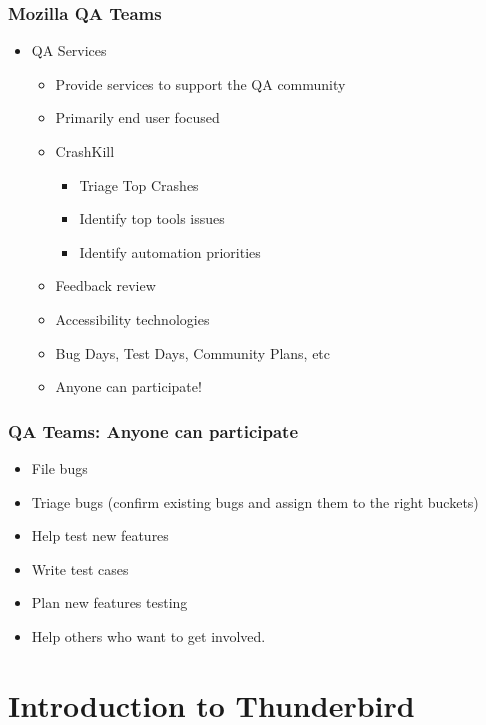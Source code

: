 \documentclass{beamer}
\begin{document}

\begin{frame}
\frametitle{Mozilla QA Teams}
 \begin{itemize}
 \item QA Services
      \begin{itemize}
      \item Provide services to support the QA community
      \item Primarily end user focused
      \item CrashKill
         \begin{itemize}
         \item Triage Top Crashes
         \item Identify top tools issues
         \item Identify automation priorities
         \end{itemize}
      \item Feedback review
      \item Accessibility technologies
      \item Bug Days, Test Days, Community Plans, etc
      \item Anyone can participate!
      \end{itemize}
 \end{itemize}

\end{frame}


\begin{frame}
\frametitle{QA Teams: Anyone can participate}
 \begin{itemize}
    \item File bugs
    \item Triage bugs (confirm existing bugs and assign them to the right buckets)
    \item Help test new features
    \item Write test cases
    \item Plan new features testing
    \item Help others who want to get involved. 
 \end{itemize}
\end{frame}


\section{Introduction to Thunderbird}
\end{document}
